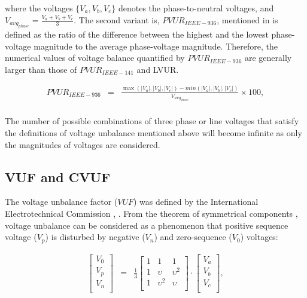 where the voltages $\{V_{a},V_{b},V_{c}\}$ denotes the phase-to-neutral voltages, and $V_{avg_{phase}}=\frac{V_{a}+V_{b}+V_{c}}{3}$.
The second variant is, $PVUR_{IEEE-936}$, mentioned in \cite{IEEE_936_29053} is defined as the ratio of the difference between the highest and the lowest phase-voltage magnitude to the average phase-voltage magnitude. Therefore, the numerical values of voltage balance quantified by $PVUR_{IEEE-936}$ are generally larger than those of $PVUR_{IEEE-141}$ and LVUR.

\begin{equation}
        \begin{array}{rcl}
            PVUR_{IEEE-936}&=&\frac{\max\left( |V_a|,|V_b|,|V_c| \right)-min\left( |V_a|,|V_b|,|V_c| \right)}{V_{avg_{phase}}}\times100,\\					
        \end{array}
        \label{BASICUNB:equ:PVUR-936}
    \end{equation}
		
The number of possible combinations of three phase or line voltages that satisfy the definitions of voltage unbalance mentioned above will become infinite as only the magnitudes of voltages are considered.	
		
	
	\subsection{VUF and CVUF}\label{BASICUNB:sec:VUFCVUF}
	
	The voltage unbalance factor ($VUF$) was defined by the International Electrotechnical Commission \cite{pillay2001definitions}, \cite{dugan1996electrical}. From the theorem of symmetrical components \cite{fortescue1918method}, voltage unbalance can be considered as a phenomenon that positive sequence voltage  ($V_p$) is disturbed by negative  ($V_n$) and zero-sequence ($V_0$) voltages:
	
	\begin{equation}
        \begin{array}{rcl}
            \begin{bmatrix}
						V_0\\
						V_p\\
						V_n\\
						\end{bmatrix}&=&
						\frac{1}{3}\begin{bmatrix}
						1&1&1\\
						1&\upsilon&\upsilon^2\\
						1&\upsilon^2&\upsilon\\
						\end{bmatrix}\cdot
						\begin{bmatrix}
						V_a\\
						V_b\\
						V_c\\
						\end{bmatrix},\\
        \end{array}
        \label{BASICUNB:equ:symmetry}
    \end{equation}
	
